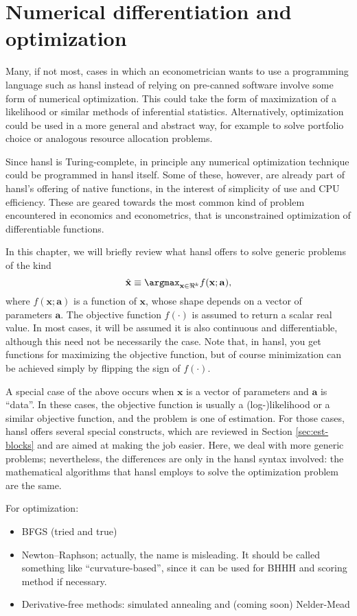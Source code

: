 \section{Numerical differentiation and optimization}

Many, if not most, cases in which an econometrician wants to use a
programming language such as hansl instead of relying on pre-canned
software involve some form of numerical optimization. This could take
the form of maximization of a likelihood or similar methods of
inferential statistics. Alternatively, optimization could be used in a
more general and abstract way, for example to solve portfolio choice
or analogous resource allocation problems.

Since hansl is Turing-complete, in principle any numerical
optimization technique could be programmed in hansl itself. Some of
these, however, are already part of hansl's offering of native
functions, in the interest of simplicity of use and CPU
efficiency. These are geared towards the most common kind of problem
encountered in economics and econometrics, that is unconstrained
optimization of differentiable functions.

In this chapter, we will briefly review what hansl offers to solve
generic problems of the kind
\[
\hat{\mathbf{x}} \equiv \argmax_{\mathbf{x} \in \Re^k} f(\mathbf{x}; \mathbf{a}),
\]
where $f(\mathbf{x}; \mathbf{a})$ is a function of $\mathbf{x}$, whose
shape depends on a vector of parameters $\mathbf{a}$. The objective
function $f(\cdot)$ is assumed to return a scalar real value. In most
cases, it will be assumed it is also continuous and differentiable,
although this need not be necessarily the case. Note that, in hansl,
you get functions for maximizing the objective function, but of course
minimization can be achieved simply by flipping the sign of
$f(\cdot)$.

A special case of the above occurs when $\mathbf{x}$ is a vector of
parameters and $\mathbf{a}$ is ``data''. In these cases, the objective
function is usually a (log-)likelihood or a similar objective
function, and the problem is one of estimation. For those cases, hansl
offers several special constructs, which are reviewed in Section
\ref{sec:est-blocks} and are aimed at making the job easier. Here, we
deal with more generic problems; nevertheless, the differences are
only in the hansl syntax involved: the mathematical algorithms that
hansl employs to solve the optimization problem are the same.


For optimization:
\begin{itemize}
\item BFGS (tried and true)
\item Newton--Raphson; actually, the name is misleading. It should be
  called something like ``curvature-based'', since it can be used for
  BHHH and scoring method if necessary.
\item Derivative-free methods: simulated annealing and (coming soon)
  Nelder-Mead
\end{itemize}

